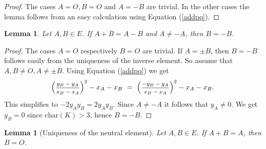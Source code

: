 \documentclass[12pt]{amsart}
\theoremstyle{plain}
\newtheorem{lemma}[theorem]{Lemma}
\theoremstyle{remark}
\theoremstyle{definition}
\newcommand{\smfrac}[2]{\mbox{\footnotesize$\displaystyle\frac{#1}{#2}$}}
\def\ba{\begin{array}}
\def\ea{\end{array}}
\def\oK{K}
\def\Char{\mbox{char}}
\begin{document}
\begin{proof}
The cases $A=O, B=O$ and $A=-B$ are trivial.
In the other cases the lemma follows from an easy calculation
using Equation (\ref{addpq}).
\end{proof}

\begin{lemma} \label{claimpmb}
Let $A,B\in E$.
If $A+B=A-B$ and $A \neq -A$, then $B=-B$.
\end{lemma}

\begin{proof}
The cases $A=O$ respectively $B=O$ are trivial. If $A=\pm B$, then $B=-B$ follows easily from the uniqueness
of the inverse element.
So assume that $A,B \ne O, A \ne \pm B$.
Using Equation (\ref{addpq}) we get
\[
\left(\smfrac{y_B-y_A}{x_B-x_A}\right)^2-x_A-x_B\,\,=\,\,\left(\smfrac{-y_B-y_A}{x_B-x_A}\right)^2-x_A-x_B. \]
This simplifies to  $ -2y_Ay_B= 2y_Ay_B$.
 Since $A \neq -A$ it follows that $y_A \neq 0$.
 We get $y_B=0$ since $\Char(K)>3$, hence $B=-B$.
\end{proof}


\begin{lemma}[Uniqueness of the neutral element]\label{claimnull}
Let $A,B\in E$. If $A+B=A$, then $B=O$.
\end{lemma}
\end{document}
